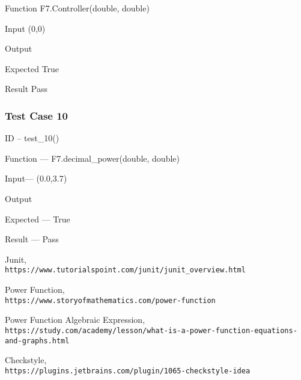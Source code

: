 \documentclass[a4paper,12pt]{article}
\begin{document}
Function \to F7.Controller(double, double)

Input \to (0,0)

Output 

Expected \to True

Result \to Pass


\subsubsection{\textbf{Test Case 10}}

ID  --   test\_10()

Function --- F7.decimal\_power(double, double)

Input--- (0.0,3.7)

Output 

Expected --- True

Result --- Pass

\begin{thebibliography}{9}
    Junit,
    \\\texttt{https://www.tutorialspoint.com/junit/junit_overview.html}

    Power Function,
    \\\texttt{https://www.storyofmathematics.com/power-function}


    Power Function Algebraic Expression,
    \\\texttt{https://study.com/academy/lesson/what-is-a-power-function-equations-and-graphs.html}

    Checkstyle,
    \\\texttt{https://plugins.jetbrains.com/plugin/1065-checkstyle-idea}
    \end{thebibliography}
\end{document}
